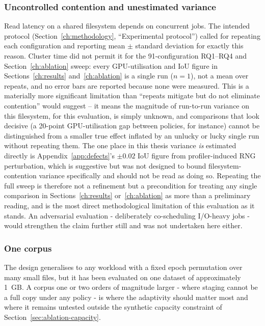 \subsubsection{Uncontrolled contention and unestimated variance}
Read latency on a shared filesystem depends on concurrent jobs. The intended
protocol (Section~\ref{ch:methodology}, ``Experimental protocol'') called for
repeating each configuration and reporting mean $\pm$ standard deviation for
exactly this reason. Cluster time did not permit it for the 91-configuration
RQ1--RQ4 and Section~\ref{ch:ablation} sweep: every GPU-utilisation and IoU
figure in Sections~\ref{ch:results} and~\ref{ch:ablation} is a single run
($n=1$), not a mean over repeats, and no error bars are reported because none
were measured. This is a materially more significant limitation than
``repeats mitigate but do not eliminate contention'' would suggest -- it means
the magnitude of run-to-run variance on this filesystem, for this evaluation,
is simply unknown, and comparisons that look decisive (a 20-point GPU-utilisation
gap between policies, for instance) cannot be distinguished from a smaller true
effect inflated by an unlucky or lucky single run without repeating them.
The one place in this thesis variance \emph{is} estimated directly is
Appendix~\ref{app:defects}'s $\pm 0.02$ IoU figure from profiler-induced RNG
perturbation, which is suggestive but was not designed to bound
filesystem-contention variance specifically and should not be read as doing so.
Repeating the full sweep is therefore not a refinement but a precondition for
treating any single comparison in Sections~\ref{ch:results}
or~\ref{ch:ablation} as more than a preliminary reading, and is the most
direct methodological limitation of this evaluation as it stands. An
adversarial evaluation - deliberately co-scheduling I/O-heavy jobs - would
strengthen the claim further still and was not undertaken here either.

\subsubsection{One corpus}
The design generalises to any workload with a fixed epoch permutation over many
small files, but it has been evaluated on one dataset of approximately 1~GB.
A corpus one or two orders of magnitude larger - where staging cannot be a
full copy under any policy - is where the adaptivity should matter most and where
it remains untested outside the synthetic capacity constraint of
Section~\ref{sec:ablation-capacity}.

